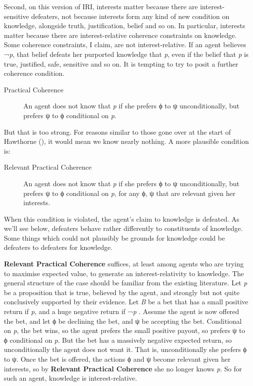 \documentclass[
  10pt,
  letterpaper,
  DIV=11,
  numbers=noendperiod,
  twoside]{scrartcl}
\begin{document}
Second, on this version of IRI, interests matter because there are
interest-sensitive defeaters, not because interests form any kind of new
condition on knowledge, alongside truth, justification, belief and so
on. In particular, interests matter because there are interest-relative
coherence constraints on knowledge. Some coherence constraints, I claim,
are not interest-relative. If an agent believes ¬\emph{p}, that belief
defeats her purported knowledge that \emph{p}, even if the belief that
\emph{p} is true, justified, safe, sensitive and so on. It is tempting
to try to posit a further coherence condition.

\begin{description}
\item[Practical Coherence]
An agent does not know that \emph{p} if she prefers ϕ to ψ
unconditionally, but prefers ψ to ϕ conditional on \emph{p}.
\end{description}

But that is too strong. For reasons similar to those gone over at the
start of Hawthorne (), it would mean
we know nearly nothing. A more plausible condition is:

\begin{description}
\item[Relevant Practical Coherence]
An agent does not know that \emph{p} if she prefers ϕ to ψ
unconditionally, but prefers ψ to ϕ conditional on \emph{p}, for any ϕ,
ψ that are relevant given her interests.
\end{description}

When this condition is violated, the agent's claim to knowledge is
defeated. As we'll see below, defeaters behave rather differently to
constituents of knowledge. Some things which could not plausibly be
grounds for knowledge could be defeaters to defeaters for knowledge.

\textbf{Relevant Practical Coherence} suffices, at least among agents
who are trying to maximise expected value, to generate an
interest-relativity to knowledge. The general structure of the case
should be familiar from the existing literature. Let \emph{p} be a
proposition that is true, believed by the agent, and strongly but not
quite conclusively supported by their evidence. Let \emph{B} be a bet
that has a small positive return if \emph{p}, and a huge negative return
if ¬\emph{p} . Assume the agent is now offered the bet, and let ϕ be
declining the bet, and ψ be accepting the bet. Conditional on \emph{p},
the bet wins, so the agent prefers the small positive payout, so prefers
ψ to ϕ conditional on \emph{p}. But the bet has a massively negative
expected return, so unconditionally the agent does not want it. That is,
unconditionally she prefers ϕ to ψ. Once the bet is offered, the actions
ϕ and ψ become relevant given her interests, so by \textbf{Relevant
Practical Coherence} she no longer knows \emph{p}. So for such an agent,
knowledge is interest-relative.
\end{document}
